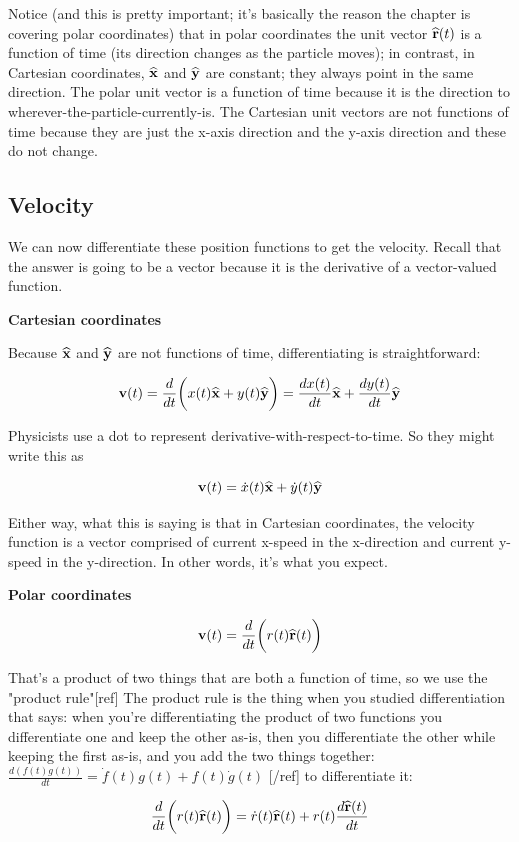 Notice (and this is pretty important; it's basically the reason the chapter is
covering polar coordinates) that in polar coordinates the unit vector
$\mathbf{\widehat{r}}(t)$ is a function of time (its direction changes as the particle moves);
in contrast, in Cartesian coordinates, $\mathbf{\widehat{x}}$ and $\mathbf{\widehat{y}}$ are constant; they
always point in the same direction. The polar unit vector is a function of time
because it is the direction to wherever-the-particle-currently-is. The
Cartesian unit vectors are not functions of time because they are just the
x-axis direction and the y-axis direction and these do not change.

\subsection{Velocity}


We can now differentiate these position functions to get the velocity. Recall
that the answer is going to be a vector because it is the derivative of a
vector-valued function.

\textbf{Cartesian coordinates}

Because $\mathbf{\widehat{x}}$ and $\mathbf{\widehat{y}}$ are not functions of time, differentiating is
straightforward:

$$\mathbf v(t) = \frac{d}{dt}\bigg(x(t)\mathbf{\widehat{x}} + y(t)\mathbf{\widehat{y}}\bigg) = \frac{d x(t)}{dt}\mathbf{\widehat{x}} + \frac{d y(t)}{dt} \mathbf{\widehat{y}}$$

Physicists use a dot to represent derivative-with-respect-to-time. So they
might write this as

$$\mathbf v(t) =  \dot x(t) \mathbf{\widehat{x}} + \dot y(t) \mathbf{\widehat{y}}$$

Either way, what this is saying is that in Cartesian coordinates, the velocity
function is a vector comprised of current x-speed in the x-direction and
current y-speed in the y-direction. In other words, it's what you expect.

\textbf{Polar coordinates}

$$\mathbf v(t) = \frac{d}{dt}\bigg(r(t)\mathbf{\widehat{r}}(t)\bigg)$$

That's a product of two things that are both a function of time, so we use the
"product rule"[ref] The product rule is the thing when you studied
differentiation that says: when you're differentiating the product of two
functions you differentiate one and keep the other as-is, then you
differentiate the other while keeping the first as-is, and you add the two
things together: $\frac{d(f(t)g(t))}{dt} = \dot f(t) g(t) + f(t) \dot g(t)$
[/ref] to differentiate it:

$$\frac{d}{dt}\bigg(r(t)\mathbf{\widehat{r}}(t)\bigg) = \dot r(t) \mathbf{\widehat{r}}(t) + r(t)\frac{d \mathbf{\widehat{r}}(t)}{dt}$$

